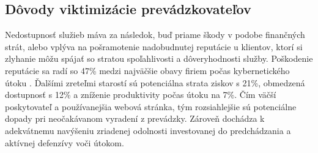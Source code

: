 \documentclass[12pt, a4paper]{article}
\begin{document}
\subsection{Dôvody viktimizácie prevádzkovateľov}
Nedostupnosť služieb máva za následok, buď priame škody v podobe finančných strát, alebo vplýva na 
pošramotenie nadobudnutej reputácie u klientov, ktorí si zlyhanie môžu spájať so stratou spoľahlivosti a 
dôveryhodnosti služby. Poškodenie reputácie sa radí so 47\% medzi najväčšie obavy firiem počas 
kybernetického útoku \cite{radware-ddos}. Ďalšími zreteľmi starostí sú potenciálna strata ziskov s 21\%, 
obmedzená dostupnosť s 12\% a zníženie produktivity počas útoku na 7\%. Čím väčší poskytovateľ a 
používanejšia webová stránka, tým rozsiahlejšie sú potenciálne dopady pri neočakávanom vyradení z prevádzky. 
Zároveň dochádza k adekvátnemu navýšeniu zriadenej odolnosti investovanej do predchádzania a aktívnej 
defenzívy voči útokom. 
\end{document}
